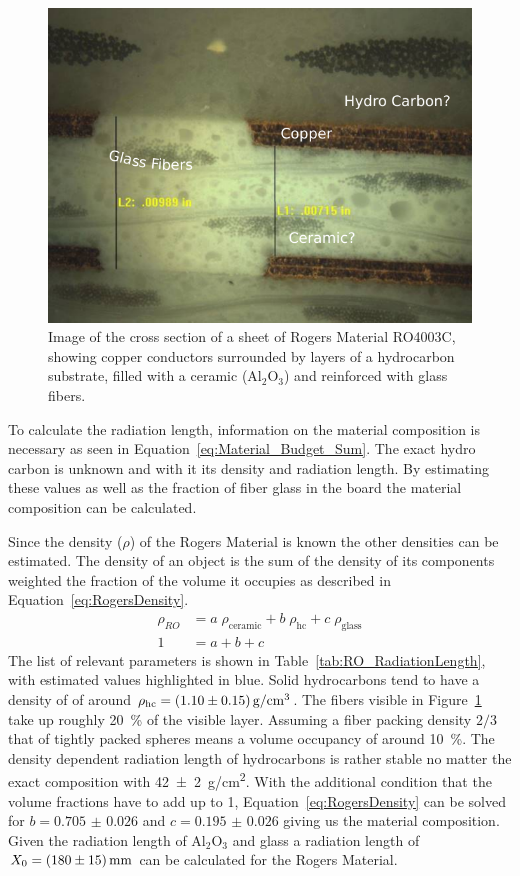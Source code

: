 \documentclass[../BTOF_summary.tex]{subfiles}
\begin{document}
\begin{figure}[htbp]
	\centering
	\includegraphics[width=.6\textwidth]{fig/RogersCrossSection.pdf}
	\caption[Image of the cross section of a sheet of Rogers Material RO4003C.]{Image of the cross section of a sheet of Rogers Material RO4003C, showing copper conductors surrounded by layers of a hydrocarbon substrate, filled with a ceramic (Al$_2$O$_3$) and reinforced with glass fibers.}
	\label{fig:RogersCrossSection}
\end{figure}

To calculate the radiation length, information on the material composition is necessary as seen in Equation~\eqref{eq:Material_Budget_Sum}. The exact hydro carbon is unknown and with it its density and radiation length. By estimating these values as well as the fraction of fiber glass in the board the material composition can be calculated.

Since the density ($\rho$) of the Rogers Material is known the other densities can be estimated. The density of an object is the sum of the density of its components weighted the fraction of the volume it occupies as described in Equation~\eqref{eq:RogersDensity}.
\begin{align}
	\rho_{RO} &= a \; \rho_\text{ceramic} + b \; \rho_\text{hc} + c \; \rho_\text{glass} \label{eq:RogersDensity} \\
	1 &= a + b + c \nonumber
\end{align}
The list of relevant parameters is shown in Table~\ref{tab:RO_RadiationLength}, with estimated values highlighted in blue.
Solid hydrocarbons tend to have a density of of around $\rho_\text{hc}=\SI{1.1\pm 0.15}{g/cm^3}$.
The fibers visible in Figure~\ref{fig:RogersCrossSection} take up roughly \SI{20}{\percent} of the visible layer. Assuming a fiber packing density $2/3$ that of tightly packed spheres means a volume occupancy of around \SI{10}{\percent}. 
The density dependent radiation length of hydrocarbons is rather stable no matter the exact composition with \SI{42 \pm 2}{g/cm^2}.
With the additional condition that the volume fractions have to add up to 1, Equation~\eqref{eq:RogersDensity} can be solved for $b = \num{0.705(26)}$ and $c = \num{0.195(26)}$ giving us the material composition.
Given the radiation length of Al$_2$O$_3$ and glass
a radiation length of $X_0=\SI{180 \pm 15}{mm}$ can be calculated for the Rogers Material.
\end{document}
